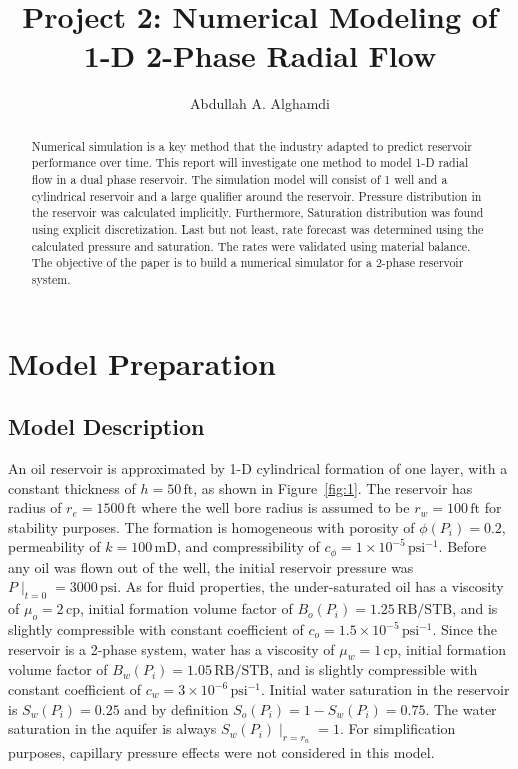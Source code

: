 \documentclass[12pt,letterpaper,titlepage]{article}
\title{Project 2: Numerical Modeling of 1-D 2-Phase Radial Flow}
\author{Abdullah A. Alghamdi}
\begin{document}
\maketitle

\renewcommand{\abstractname}{Executive Summary}
\begin{abstract}
Numerical simulation is a key method that the industry adapted to predict reservoir performance over time. This report will investigate one method to model 1-D radial flow in a dual phase reservoir. The simulation model will consist of 1 well and a cylindrical reservoir and a large qualifier around the reservoir. Pressure distribution in the reservoir was calculated implicitly. Furthermore, Saturation distribution was found using explicit discretization. Last but not least, rate forecast was determined using the calculated pressure and saturation. The rates were validated using material balance. The objective of the paper is to build a numerical simulator for a 2-phase reservoir system.
\end{abstract}
\tableofcontents
\pagebreak
\listoffigures
\pagebreak
\section{Model Preparation}
\subsection{Model Description}
An oil reservoir is approximated by 1-D cylindrical formation of one layer, with a constant thickness of $h=50 \,\text{ft}$, as shown in Figure~\ref{fig:1}. The reservoir has radius of $r_e=1500 \,\text{ft}$ where the well bore radius is assumed to be $r_w=100 \,\text{ft}$ for stability purposes. The formation is homogeneous with porosity of $\phi(P_i)=0.2$, permeability of $k=100 \,\text{mD}$, and compressibility of $c_\phi=1\times10^{-5} \,\text{psi}^{-1}$. Before any oil was flown out of the well, the initial reservoir pressure was $P\mid_{t=0}=3000 \,\text{psi}$.
As for fluid properties, the under-saturated oil has a viscosity of $\mu_o=2 \,\text{cp}$, initial formation volume factor of $B_o(P_i)=1.25 \,\text{RB/STB}$, and is slightly compressible with constant coefficient of $c_o=1.5\times10^{-5} \,\text{psi}^{-1}$. Since the reservoir is a 2-phase system, water has a viscosity of $\mu_w=1 \,\text{cp}$, initial formation volume factor of $B_w(P_i)=1.05 \,\text{RB/STB}$, and is slightly compressible with constant coefficient of $c_w=3\times10^{-6} \,\text{psi}^{-1}$. Initial water saturation in the reservoir is $S_w(P_i)=0.25$ and by definition $S_o(P_i)=1-S_w(P_i)=0.75$. The water saturation in the aquifer is always $S_w(P_i)\mid_{r=r_n}=1$.
For simplification purposes, capillary pressure effects were not considered in this model.
\end{document}
